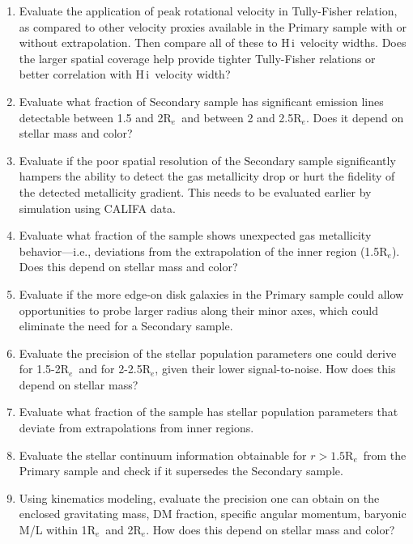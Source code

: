 \documentclass[preprint,11pt]{aastex}
\newcommand{\Reff}{{R$_{e}$}}
\newcommand{\HI}{{\sc H\,i}}
\begin{document}
\begin{enumerate}
\item Evaluate the application of peak rotational velocity in
  Tully-Fisher relation, as compared to other velocity proxies
  available in the Primary sample with or without extrapolation. Then
  compare all of these to \HI\ velocity widths. Does the larger
  spatial coverage help provide tighter Tully-Fisher relations or
  better correlation with \HI\ velocity width?

\item Evaluate what fraction of Secondary sample has significant
  emission lines detectable between 1.5 and 2\Reff\ and between 2 and
  2.5\Reff. Does it depend on stellar mass and color? 

\item Evaluate if the poor spatial resolution of the Secondary sample
  significantly hampers the ability to detect the gas metallicity drop
  or hurt the fidelity of the detected metallicity gradient. This
  needs to be evaluated earlier by simulation using CALIFA data.

\item Evaluate what fraction of the sample shows unexpected gas
  metallicity behavior---i.e., deviations from the extrapolation of
  the inner region (1.5\Reff). Does this depend on stellar mass and
  color?

\item Evaluate if the more edge-on disk galaxies in the Primary sample
  could allow opportunities to probe larger radius along their minor
  axes, which could eliminate the need for a Secondary sample.

\item Evaluate the precision of the stellar population parameters one
  could derive for 1.5-2\Reff\ and for 2-2.5\Reff, given their lower
  signal-to-noise. How does this depend on stellar mass?

\item Evaluate what fraction of the sample has stellar population
  parameters that deviate from extrapolations from inner regions.

\item Evaluate the stellar continuum information obtainable for
  $r>1.5$\Reff\ from the Primary sample and check if it supersedes the
  Secondary sample.

\item Using kinematics modeling, evaluate the precision one can obtain
  on the enclosed gravitating mass, DM fraction, specific angular
  momentum, baryonic M/L within 1\Reff\ and 2\Reff. How does this depend on stellar mass and color?
\end{enumerate}
\end{document}
